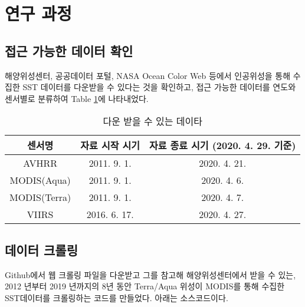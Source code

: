 \section{연구 과정}

\subsection{접근 가능한 데이터 확인}

해양위성센터, 공공데이터 포털, NASA Ocean Color Web 등에서 인공위성을 통해 수집한 SST 데이터를 다운받을 수 있다는 것을 확인하고, 접근 가능한 데이터를 연도와 센서별로 분류하여 \textrm{Table} \ref{Table:data}에 나타내었다.

\begin{center}
\begin{table}[h]
	\caption{다운 받을 수 있는 데이타}
	\begin{tabular}{c|c|c}
		\hline
		센서명          & 자료 시작 시기     & 자료 종료 시기 (2020. 4. 29. 기준) \\ \hline
		AVHRR        & 2011. 9. 1.  & 2020. 4. 21.               \\ \hline
		MODIS(Aqua)  & 2011. 9. 1.  & 2020. 4. 6.                \\ \hline
		MODIS(Terra) & 2011. 9. 1.  & 2020. 4. 7.                \\ \hline
		VIIRS        & 2016. 6. 17. & 2020. 4. 27.               \\ \hline
	\end{tabular}
	\label{Table:data}	
\end{table}
\end{center}
	
\subsection{데이터 크롤링}
Github에서 웹 크롤링 파일을 다운받고 그를 참고해 해양위성센터에서 받을 수 있는, 2012 년부터 2019 년까지의 8년 동안 Terra/Aqua 위성이 MODIS를 통해 수집한 SST데이터를 크롤링하는 코드를 만들었다. 아래는 소스코드이다. 



